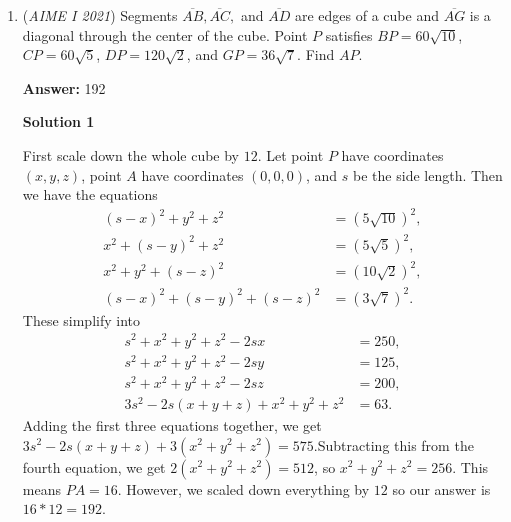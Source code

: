 \begin{enumerate}
\textbf{Solution 5}

Following from previous solutions, we derive $3x^2+2a^2=xa^2.$ We divide both sides to get $3\left(\frac{x}{a}\right)^2+2=x.$ Since $x$ is an integer, $\frac{x}{a}$ must also be an integer, so we have $x=pa$, for some factor $p$. We then get $3p^2+2=pa.$ We then take this to modulo $p$, getting $2\equiv 0 \pmod p.$ The only possibilities for $p$ are therefore 1 and 2. We plug these into $3p^2+2=pa$, for $a=5$ and $x=5$, giving us the sequence $0,5,10$, or $2a=14$ and $x=14$, for the sequence $7,14,21.$ $10+21 = \boxed{031}.$

 -RYang2

 


	\item (\textit{AIME I 2021}) Segments $\overline{AB}, \overline{AC},$ and $\overline{AD}$ are edges of a cube and $\overline{AG}$ is a diagonal through the center of the cube. Point $P$ satisfies $BP=60\sqrt{10}$, $CP=60\sqrt{5}$, $DP=120\sqrt{2}$, and $GP=36\sqrt{7}$. Find $AP.$

 \textbf{Answer: }192



\textbf{Solution 1}

First scale down the whole cube by $12$. Let point $P$ have coordinates $(x, y, z)$, point $A$ have coordinates $(0, 0, 0)$, and $s$ be the side length. Then we have the equations
 \begin{align*} (s-x)^2+y^2+z^2&=\left(5\sqrt{10}\right)^2, \\ x^2+(s-y)^2+z^2&=\left(5\sqrt{5}\right)^2, \\ x^2+y^2+(s-z)^2&=\left(10\sqrt{2}\right)^2, \\ (s-x)^2+(s-y)^2+(s-z)^2&=\left(3\sqrt{7}\right)^2. \end{align*}
These simplify into
 \begin{align*} s^2+x^2+y^2+z^2-2sx&=250, \\ s^2+x^2+y^2+z^2-2sy&=125, \\ s^2+x^2+y^2+z^2-2sz&=200, \\ 3s^2-2s(x+y+z)+x^2+y^2+z^2&=63. \end{align*}
Adding the first three equations together, we get $3s^2-2s(x+y+z)+3(x^2+y^2+z^2)=575$.Subtracting this from the fourth equation, we get $2(x^2+y^2+z^2)=512$, so $x^2+y^2+z^2=256$. This means $PA=16$. However, we scaled down everything by $12$ so our answer is $16*12=\boxed{192}$.

 




\end{enumerate}
